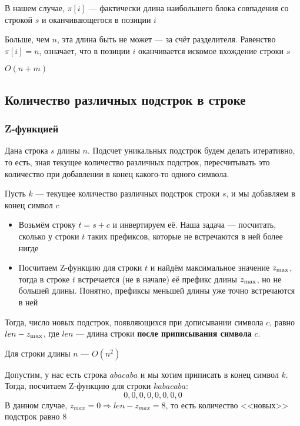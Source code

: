 \documentclass[a4paper]{article}
\begin{document}
В нашем случае, $\pi[i]$ — фактически длина наибольшего блока совпадения со строкой $s$ и оканчивающегося в позиции $i$

Больше, чем $n$, эта длина быть не может — за счёт разделителя. Равенство $\pi[i] = n$, означает, что в позиции $i$ оканчивается искомое вхождение строки $s$

\difficulty $O(n+m)$


\subsection{Количество различных подстрок в строке}
\subsubsection{Z-функцией}
Дана строка $s$ длины $n$. Подсчет уникальных подстрок будем делать итеративно, то есть, зная текущее количество различных подстрок, пересчитывать это количество при добавлении в конец какого-то одного символа.

Пусть $k$ — текущее количество различных подстрок строки $s$, и мы добавляем в конец символ $c$
\begin{itemize}
    \item Возьмём строку $t = s + c$ и инвертируем её. Наша задача — посчитать, сколько у строки $t$ таких префиксов, которые не встречаются в ней более нигде
    \item Посчитаем Z-функцию для строки $t$ и найдём максимальное значение $z_{\rm max}$, тогда в строке $t$ встречается (не в начале) её префикс длины $z_{\rm max}$, но не большей длины. Понятно, префиксы меньшей длины уже точно встречаются в ней
\end{itemize}

Тогда, число новых подстрок, появляющихся при дописывании символа $c$, равно $len - z_{\rm max}$, где $len$ — длина строки \textbf{после приписывания символа} $c$.

\difficulty Для строки длины $n$ — $O(n^2)$

\ex Допустим, у нас есть строка $abacaba$ и мы хотим приписать в конец символ $k$. Тогда, посчитаем Z-функцию для строки $kabacaba$:
\begin{equation*}
    0,0,0,0,0,0,0,0
\end{equation*}
В данном случае, $z_{max}=0\Longrightarrow len-z_{max}=8$, то есть количество <<новых>> подстрок равно 8
\end{document}
